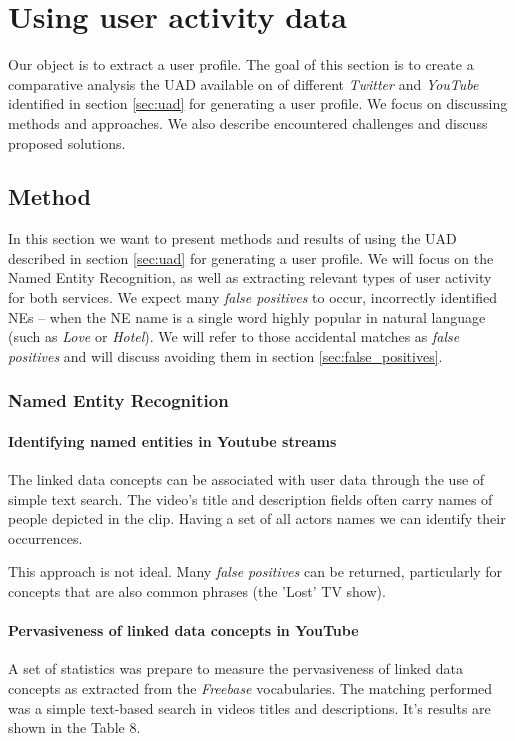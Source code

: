 \section{Using user activity data}
\label{sec:usage_uad}

Our object is to extract a user profile. The goal of this section is to create a comparative analysis the UAD
available on of different \textit{Twitter} and \textit{YouTube} identified in section \ref{sec:uad} for generating
a user profile. We focus on discussing methods and approaches. We also describe encountered challenges and discuss
proposed solutions.

\subsection{Method}
In this section we want to present methods and results of using the UAD described in section \ref{sec:uad} for
generating a user profile. We will focus on the Named Entity Recognition, as well as extracting relevant types
of user activity for both services. We expect many \textit{false positives} to occur, \ie incorrectly identified NEs
-- when the NE name is a single word highly popular in natural language (such as \textit{Love} or \textit{Hotel}).
We will refer to those accidental matches as \textit{false positives} and will discuss avoiding them in section
\ref{sec:false_positives}.

\subsubsection{Named Entity Recognition}
\label{sec:ner}

\paragraph{Identifying named entities in Youtube streams}
The linked data concepts can be associated with user data through the use of
simple text search. The video's title and description fields often carry names
of people depicted in the clip. Having a set of all actors names we can
identify their occurrences.

This approach is not ideal. Many \textit{false positives} can be returned, particularly
for concepts that are also common phrases (\eg the 'Lost' TV show).

\paragraph{Pervasiveness of linked data concepts in YouTube}
A set of statistics was prepare to measure the pervasiveness of linked data
concepts as extracted from the \textit{Freebase} vocabularies. The matching performed
was a simple text-based search in videos titles and descriptions. It's results
are shown in the Table 8.

